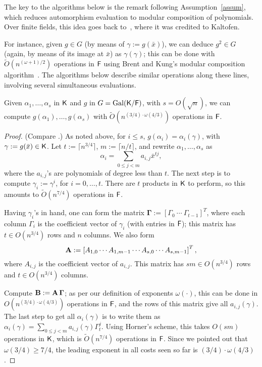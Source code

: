 The key to the algorithms below is the remark following
Assumption~\ref{assum}, which reduces automorphism evaluation to
modular composition of polynomials.  Over finite fields, this idea goes back
to~, where it was credited to Kaltofen.

For instance, given $g \in G$ (by means of $\gamma:=g(\bar x)$), we can
deduce $g^2 \in G$ (again, by means of its image at $\bar x$) as
$\gamma(\gamma)$; this can be done with $\tilde{O}(n^{(\omega+1)/2})$
operations in ${\mathsf{F}}$ using Brent and Kung's modular composition
algorithm~\cite{BrKu78}. The algorithms below describe similar operations
along these lines, involving several simultaneous evaluations.

\begin{lemma}
  \label{lem:modcom}
  Given $\alpha_1,\dots,\alpha_s$ in ${\mathsf{K}}$ and $g$ in $G =
  \mathrm{Gal}({\mathsf{K}}/{\mathsf{F}})$, with $s = O(\sqrt{n})$, we can compute
  $g(\alpha_1),\dots,g(\alpha_s)$ with $\tilde
  O(n^{(3/4)\cdot\omega(4/3)})$ operations in ${\mathsf{F}}$.
\end{lemma}
\begin{proof}
(Compare \cite[Lemma~3]{KalSho98}.) As noted above, for $i\le s$,
  $g(\alpha_i) = \alpha_i(\gamma)$, with $\gamma := g(\bar x) \in {\mathsf{K}}$.
  Let $t := \lceil n^{3/4} \rceil$, $m:=\lceil n/t\rceil$, and rewrite $\alpha_1 , \ldots , \alpha_s$ as 
$$\alpha_i = \sum_{0 \leq j < m} a_{i,j}\bar x^{tj},$$ where the
  $a_{i,j}$'s are polynomials of degree less than $t$. The next step
  is to compute $\gamma_i := \gamma^i$, for $i = 0 , \ldots , t$.
  There are $t$ products in ${\mathsf{K}}$ to perform, so this amounts to
  $\tilde{O}(n^{7/4})$ operations in ${\mathsf{F}}$.

  Having $\gamma_i$'s in hand, one can form the matrix
  $\boldsymbol{\Gamma} := \left[ \Gamma_0 ~ \cdots ~ \Gamma_{t-1}
    \right]^T$, where each column $\Gamma_i$ is the coefficient vector
  of $\gamma_i$ (with entries in ${\mathsf{F}}$); this matrix has $t \in
  O(n^{3/4})$ rows and $n$ columns. We also form
  $$\mat A := \left[{A}_{1,0} \cdots {A}_{1,m-1} \cdots
    {A}_{s,0} \cdots {A}_{s,m-1}\right]^T,$$ where
  ${A}_{i,j}$ is the coefficient vector of $a_{i,j}$. This matrix 
  has $s m \in O(n^{3/4})$ rows and $t \in O(n^{3/4})$ columns.

  Compute $\mat B:=\mat A\, \boldsymbol{\Gamma}$; as per our
  definition of exponents $\omega(\cdot )$, this can be done in
  $O(n^{(3/4)\cdot \omega(4/3)})$ operations in ${\mathsf{F}}$, and the rows of this matrix
  give all $a_{i,j}(\gamma)$.  The last step to get all
  $\alpha_i(\gamma)$ is to write them as $\alpha_i(\gamma) = \sum_{0
    \leq j < m} a_{i,j}(\gamma) \Gamma_t^{j}.$ Using Horner's scheme,
  this takes $O(sm)$ operations in ${\mathsf{K}}$, which is $\tilde{O}(n^{7/4})$
  operations in ${\mathsf{F}}$. Since we pointed out that $\omega(3/4) \ge 7/4$,
  the leading exponent in all costs seen so far is
  $(3/4)\cdot\omega(4/3)$.
\end{proof}


